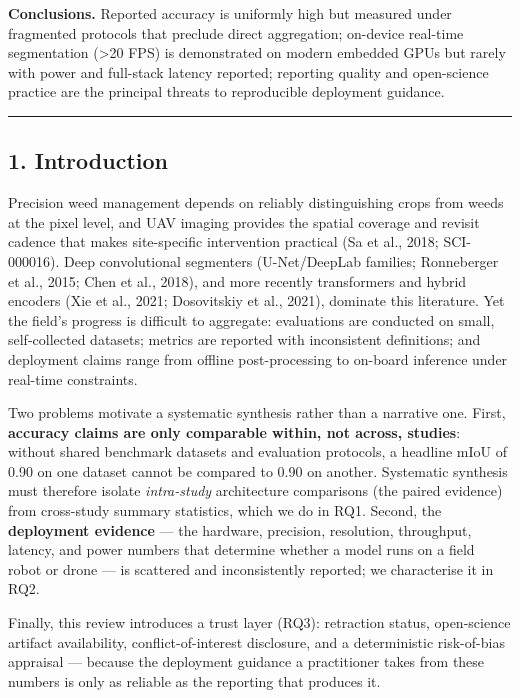 \documentclass[11pt]{article}
\begin{document}
\textbf{Conclusions.} Reported accuracy is uniformly high but measured
under fragmented protocols that preclude direct aggregation; on-device
real-time segmentation (\textgreater20 FPS) is demonstrated on modern
embedded GPUs but rarely with power and full-stack latency reported;
reporting quality and open-science practice are the principal threats to
reproducible deployment guidance.

\begin{center}\rule{0.5\linewidth}{0.5pt}\end{center}

\subsection{1. Introduction}\label{introduction}

Precision weed management depends on reliably distinguishing crops from
weeds at the pixel level, and UAV imaging provides the spatial coverage
and revisit cadence that makes site-specific intervention practical (Sa
et al., 2018; SCI-000016). Deep convolutional segmenters (U-Net/DeepLab
families; Ronneberger et al., 2015; Chen et al., 2018), and more
recently transformers and hybrid encoders (Xie et al., 2021; Dosovitskiy
et al., 2021), dominate this literature. Yet the field's progress is
difficult to aggregate: evaluations are conducted on small,
self-collected datasets; metrics are reported with inconsistent
definitions; and deployment claims range from offline post-processing to
on-board inference under real-time constraints.

Two problems motivate a systematic synthesis rather than a narrative
one. First, \textbf{accuracy claims are only comparable within, not
across, studies}: without shared benchmark datasets and evaluation
protocols, a headline mIoU of 0.90 on one dataset cannot be compared to
0.90 on another. Systematic synthesis must therefore isolate
\emph{intra-study} architecture comparisons (the paired evidence) from
cross-study summary statistics, which we do in RQ1. Second, the
\textbf{deployment evidence} --- the hardware, precision, resolution,
throughput, latency, and power numbers that determine whether a model
runs on a field robot or drone --- is scattered and inconsistently
reported; we characterise it in RQ2.

Finally, this review introduces a trust layer (RQ3): retraction status,
open-science artifact availability, conflict-of-interest disclosure, and
a deterministic risk-of-bias appraisal --- because the deployment
guidance a practitioner takes from these numbers is only as reliable as
the reporting that produces it.
\end{document}
